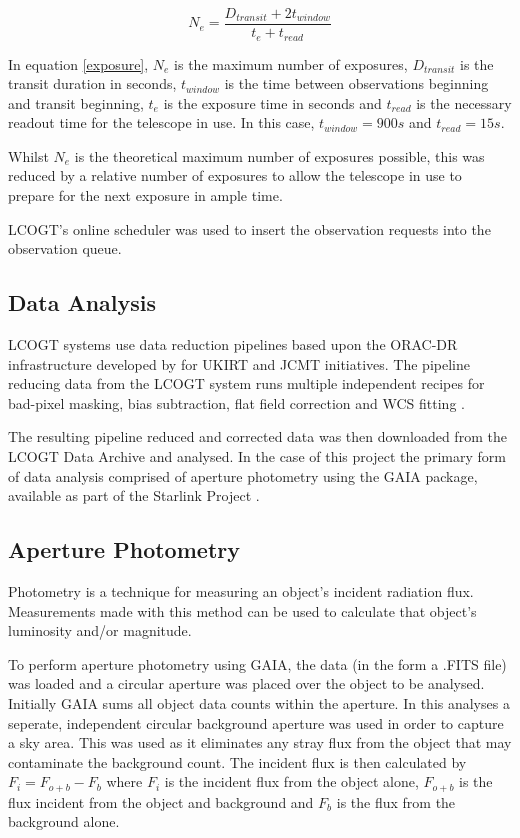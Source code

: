 \documentclass{article}
\begin{document}
\begin{equation} \label{exposure}
    N_{e} = \frac{D_{transit} + 2t_{window}}{t_{e} + t_{read}}
\end{equation}

In equation \ref{exposure}, $N_{e}$ is the maximum number of exposures, $D_{transit}$ is the transit duration in seconds, $t_{window}$ is the time between observations beginning and transit beginning, $t_{e}$ is the exposure time in seconds and $t_{read}$ is the necessary readout time for the telescope in use. In this case, $t_{window}=900s$ and $t_{read}=15s$.

Whilst $N_{e}$ is the theoretical maximum number of exposures possible, this was reduced by a relative number of exposures to allow the telescope in use to prepare for the next exposure in ample time. 

LCOGT's online scheduler was used to insert the observation requests into the observation queue.

\subsection{Data Analysis}
LCOGT systems use data reduction pipelines based upon the ORAC-DR infrastructure developed by \textcite{orac-dr} for UKIRT and JCMT initiatives. The pipeline reducing data from the LCOGT system runs multiple independent recipes for bad-pixel masking, bias subtraction, flat field correction and WCS fitting \parencite{pipeline}.  

The resulting pipeline reduced and corrected data was then downloaded from the LCOGT Data Archive and analysed. In the case of this project the primary form of data analysis comprised of aperture photometry using the GAIA package, available as part of the Starlink Project \parencite{starlink}.

\subsection{Aperture Photometry}
Photometry is a technique for measuring an object's incident radiation flux. Measurements made with this method can be used to calculate that object's luminosity and/or magnitude.

To perform aperture photometry using GAIA, the data (in the form a .FITS file) was loaded and a circular aperture was placed over the object to be analysed. Initially GAIA sums all object data counts within the aperture. In this analyses a seperate, independent circular background aperture was used in order to capture a sky area. This was used as it eliminates any stray flux from the object that may contaminate the background count. The incident flux is then calculated by $F_{i} = F_{o+b} - F_{b}$ where $F_{i}$ is the incident flux from the object alone, $F_{o+b}$ is the flux incident from the object and background and $F_{b}$ is the flux from the background alone.
\end{document}
